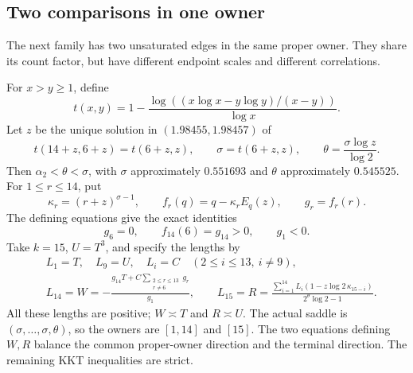 \subsection{Two comparisons in one owner}

The next family has two unsaturated edges in the same proper owner.
They share its count factor, but have different endpoint scales and
different correlations.

For \(x>y\ge1\), define
\[
 t(x,y)=1-\frac{\log((x\log x-y\log y)/(x-y))}{\log x}.
\]
Let \(z\) be the unique solution in \((1.98455,1.98457)\) of
\begin{equation}
 t(14+z,6+z)=t(6+z,z),\qquad
 \sigma=t(6+z,z),\qquad \theta=\frac{\sigma\log z}{\log2}.
 \label{ex:same-root}
\end{equation}
Then \(\alpha_2<\theta<\sigma\), with
\(\sigma\) approximately \(0.551693\) and \(\theta\) approximately
\(0.545525\).  For \(1\le r\le14\), put
\[
 \kappa_r=(r+z)^{\sigma-1},\qquad
 f_r(q)=q-\kappa_r E_q(z),\qquad g_r=f_r(r).
\]
The defining equations give the exact identities
\begin{equation}
 g_6=0,\qquad f_{14}(6)=g_{14}>0,
 \qquad g_1<0.
 \label{ex:same-balances}
\end{equation}
Take \(k=15\), \(U=T^3\), and specify the lengths by
\begin{align}
 &L_1=T,\quad L_9=U,\quad
 L_i=C\quad(2\le i\le13,\ i\ne9),\nonumber\\
 &L_{14}=W=-\frac{g_{14}T+
                C\sum_{\substack{2\le r\le13\\r\ne6}}g_r}{g_1},
 \qquad
 L_{15}=R=
 \frac{\sum_{i=1}^{14}L_i(1-z\log2\,\kappa_{15-i})}
 {2^\theta\log2-1}.
 \label{ex:same-lengths}
\end{align}
All these lengths are positive; \(W\asymp T\) and \(R\asymp U\).
The actual saddle is
\((\sigma,\ldots,\sigma,\theta)\), so the owners are \([1,14]\) and
\([15]\).  The two equations defining \(W,R\) balance the common
proper-owner direction and the terminal direction.  The remaining KKT
inequalities are strict.

